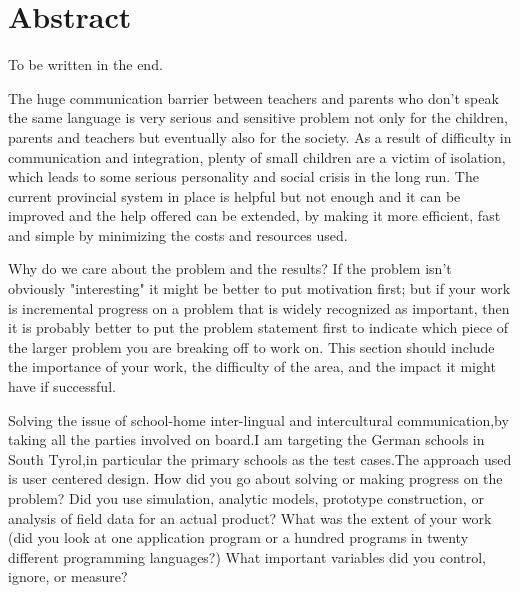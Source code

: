 \chapter*{Abstract}

\begin{description}
  \item  To be written in the end. 
  \item[Problem statement] The huge communication barrier between
  teachers and parents who don't speak the same language is very serious
  and sensitive problem not only for the children, parents and teachers 
  but eventually also for the society.\newline
  As a result of difficulty in communication and integration, plenty of
  small children are a victim of isolation, which leads to some serious 
  personality and social crisis in the long run. \newline
  The current provincial system in place is helpful but not enough and 
  it can be improved and the help offered can be extended, by making it
  more efficient, fast and simple by minimizing the costs and resources 
  used. 
 

  \item[Motivation] Why do we care about the problem and the results?
  If the problem isn't obviously "interesting" it might be better to put
  motivation first; but if your work is incremental progress on a problem that
  is widely recognized as important, then it is probably better to put the
  problem statement first to indicate which piece of the larger problem you are
  breaking off to work on. This section should include the importance of your
  work, the difficulty of the area, and the impact it might have if successful.

  \item[Approach]Solving the issue of school-home inter-lingual and intercultural
  communication,by taking all the parties involved on board.I am targeting
  the German schools in South Tyrol,in particular the primary schools as the
  test cases.The approach used is user centered design.\newline
  How did you go about solving or making progress on the problem? Did you use simulation, analytic models, prototype construction,
  or analysis of field data for an actual product? What was the extent of your
  work (did you look at one application program or a hundred programs in twenty
  different programming languages?) What important variables did you control,
  ignore, or measure?


\end{description}
